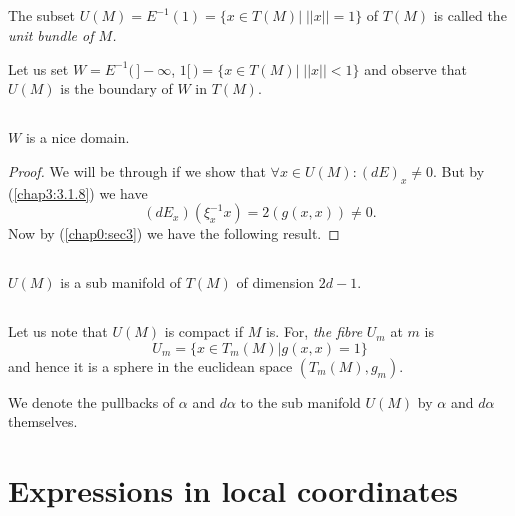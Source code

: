 \subsection{}\label{chap3:3.7.1}

\begin{defi*}
The subset $U(M)=E^{-1}(1)=\{x\in T(M)\big|\; ||x||=1\}$ of $T(M)$ is
called the {\em unit bundle of $M$.}

Let us set $W=E^{-1}(\,]-\infty$, $1[\,)=\{x\in T(M)\big|\; ||x||<1\}$
    and observe that $U(M)$ is the boundary of $W$ in $T(M)$.
\end{defi*}

\subsection{}\label{chap3:3.7.2}

\begin{lemma*}
$W$ \pageoriginale is a nice domain.
\end{lemma*}

\begin{proof}
We will be through if we show that $\forall x \in
U(M):(dE)_{x}\neq 0$. But by (\ref{chap3:3.1.8}) we have
$$
(dE_{x})(\xi^{-1}_{x}x)=2(g(x,x))\neq 0.
$$
Now by (\ref{chap0:sec3}) we have the following result.
\end{proof}

\subsection{}\label{chap3:prop3.7.3}

\begin{prop*}
$U(M)$ is a sub manifold of $T(M)$ of dimension $2d-1$.
\end{prop*}

\setcounter{subsection}{3}
\subsection{}\label{chap3:3.7.4}
Let us note that $U(M)$ is compact if $M$ is. For, {\em the fibre}
$U_{m}$ at $m$ is
$$
U_{m}=\{x\in T_{m}(M)|g(x,x)=1\}
$$
and hence it is a sphere in the euclidean space $(T_{m}(M),g_{m})$.

We denote the pullbacks of $\alpha$ and $d\alpha$ to the sub manifold
$U(M)$ by $\alpha$ and $d\alpha$ themselves.

\section{Expressions in local coordinates}\label{chap3:sec8}

